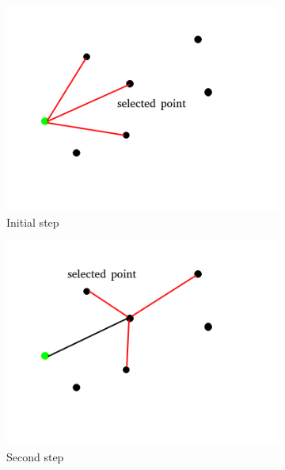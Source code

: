 \begin{figure}[h!]
  \centering
  \begin{subfigure}[b]{0.4\linewidth}
    \includegraphics[width=\linewidth]{media/GRASP1.png}
     \caption{Initial step}
  \end{subfigure}
  \begin{subfigure}[b]{0.4\linewidth}
    \includegraphics[width=\linewidth]{media/GRASP2.png}
    \caption{Second step}
  \end{subfigure}
  \begin{subfigure}[b]{0.4\linewidth}

\end{subfigure}
\end{figure}
